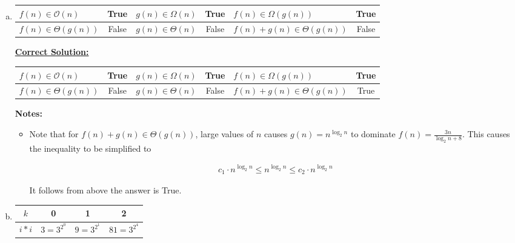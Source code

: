 \documentclass[12pt]{article}
\begin{document}
\begin{enumerate}[a.]
    \item

    \begin{tabular}{|l|c|l|c|l|c|}
        \hline
        $f(n) \in \mathcal{O}(n)$ & True & $g(n) \in \Omega(n)$ & True & $f(n) \in \Omega(g(n))$ & True\\
        \hline
        $f(n) \in \Theta(g(n))$ & False & $g(n) \in \Theta(n)$ & False & $f(n) + g(n) \in \Theta(g(n))$ & False\\
        \hline
    \end{tabular}

    \begin{mdframed}
        \underline{\textbf{Correct Solution:}}

        \bigskip

        \begin{tabular}{|l|c|l|c|l|c|}
            \hline
            $f(n) \in \mathcal{O}(n)$ & True & $g(n) \in \Omega(n)$ & True & $f(n) \in \Omega(g(n))$ & True\\
            \hline
            $f(n) \in \Theta(g(n))$ & False & $g(n) \in \Theta(n)$ & False & $f(n) + g(n) \in \Theta(g(n))$ & \color{red}True\color{black}\\
            \hline
        \end{tabular}

    \end{mdframed}

    \bigskip

    \textbf{Notes:}

    \begin{itemize}
        \item Note that for $f(n) + g(n) \in \Theta(g(n))$, large values of $n$
        causes $g(n) = n^{\log_2 n}$ to dominate $f(n) = \frac{3n}{\log_2 n + 8}$.
        This causes the inequality to be simplified to

        \setcounter{equation}{0}
        \begin{align}
            c_1 \cdot n^{\log_2 n} \leq n^{\log_2 n} \leq c_2 \cdot n^{\log_2 n}
        \end{align}

        \bigskip

        It follows from above the answer is True.
    \end{itemize}

    \item

    \begin{tabular}{|c|c|c|c|}
        \hline
        $k$ & 0 & 1 & 2 \\
        \hline
        $i * i$ & $3 = 3^{2^0}$ & $9 = 3^{2^1}$ & $81 = 3^{2^4}$\\
        \hline
    \end{tabular}


\end{enumerate}
\end{document}
